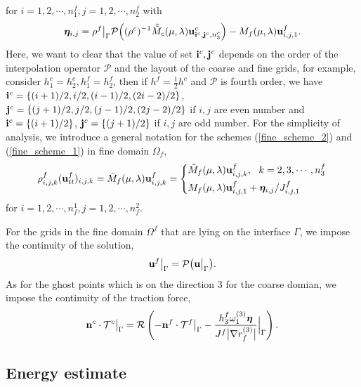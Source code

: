 \documentclass[a4paper]{article}
\begin{document}
for $ i = 1,2,\cdots,n_1^f, j = 1,2,\cdots,n_2^f$ with
\begin{equation}\label{eta}
{\bm \eta}_{i,j} = \rho^f\big|_\Gamma\mathcal{P}\Big((\rho^c)^{-1}\tilde{\tilde{M}}_c(\mu,\lambda){\bf u}^c_{{\bf i}^c,{\bf j}^c,n_3^c}\Big)-M_f(\mu,\lambda){\bf u}^f_{i,j,1}.
\end{equation}
Here, we want to clear that the value of set ${\bf i}^c, {\bf j}^c$ depends on the order of the interpolation operator $\mathcal{P}$ and the layout of the coarse and fine grids, for example, consider $h_1^c = h_2^c, h_1^f = h_2^f$, then if $h^f = \frac{1}{2}h^c$ and $\mathcal{P}$ is fourth order,  we have ${\bf i}^c = \{(i+1)/2,i/2,(i-1)/2,(2i-2)/2\}$, ${\bf j}^c = \{(j+1)/2,j/2,(j-1)/2,(2j-2)/2\}$ if $i,j$ are even number and ${\bf i}^c = \{(i+1)/2\}$, ${\bf j}^c = \{(j+1)/2\}$ if $i,j$ are odd number. For the simplicity of analysis, we introduce a general notation for the schemes (\ref{fine_scheme_2}) and (\ref{fine_scheme_1}) in fine domain $\Omega_f$,
\begin{equation}\label{fine_scheme}
\rho^f_{i,j,k} ({\bf u}_{tt}^f)_{i,j,k} = \bar{M}_f(\mu,\lambda){\bf u}^f_{i,j,k} =  \left\{
\begin{aligned}
&\tilde{M}_f(\mu,\lambda) {\bf{u}}^f_{i,j,k}, \ \ k = 2,3,\cdots,n_3^f\\
&M_f(\mu,\lambda){\bf u}^f_{i,j,1}+{\bm \eta}_{i,j}/J^f_{i,j,1}
\end{aligned}
\right.
\end{equation}
for $i = 1,2,\cdots,n_f^1, j = 1,2,\cdots,n_f^2$.

For the grids in the fine domain $\Omega^f$  that are lying on the interface $\Gamma$, we impose the continuity of the solution,
\begin{equation}\label{data_continuous_curvi}
{\bf u}^f\big|_{\Gamma} = \mathcal{P}\big({\bf u}\big|_{\Gamma}\big).
\end{equation}
As for the ghost points which is on the direction 3 for the coarse domian, we impose the continuity of the traction force,
\begin{equation}\label{traction_continuous_curvi}
{\bf n}^c\cdot\mathcal{T}^c \big|_\Gamma = \mathcal{R}\left(-{\bf n}^f\cdot\mathcal{T}^f\big|_\Gamma - \frac{h_3^f\omega_1^{(3)}{\bm \eta}}{J^f\big|\nabla r_f^{(3)}\big|}\Big|_\Gamma\right).
\end{equation}

\subsection{Energy estimate}
\end{document}
